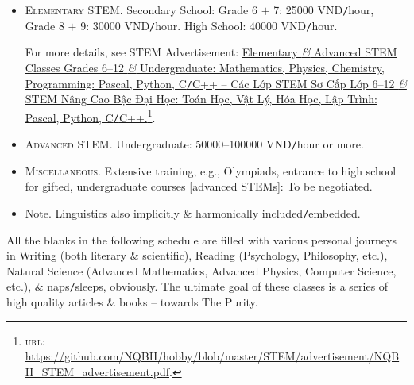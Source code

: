 \documentclass[landscape,a4paper]{article}
\begin{document}
\begin{itemize}
	\item \textsc{Elementary STEM.} Secondary School: Grade 6 $+$ 7: 25000 VND{\tt/}hour, Grade 8 $+$ 9: 30000 VND{\tt/}hour. High School: 40000 VND{\tt/}hour.
	
	For more details, see STEM Advertisement: \href{https://github.com/NQBH/hobby/blob/master/STEM/advertisement/NQBH_STEM_advertisement.pdf}{Elementary {\it\&} Advanced STEM Classes Grades 6--12 {\it\&} Undergraduate: Mathematics, Physics, Chemistry, Programming: Pascal, Python, C{\tt/}C++ -- Các Lớp STEM Sơ Cấp Lớp 6--12 {\it\&} STEM Nâng Cao Bậc Đại Học: Toán Học, Vật Lý, Hóa Học, Lập Trình: Pascal, Python, C{\tt/}C++.}\footnote{\textsc{url}: \url{https://github.com/NQBH/hobby/blob/master/STEM/advertisement/NQBH_STEM_advertisement.pdf}.}.
	\item \textsc{Advanced STEM.} Undergraduate: 50000--100000 VND{\tt/}hour or more.
	\item \textsc{Miscellaneous.} Extensive training, e.g., Olympiads, entrance to high school for gifted, undergraduate courses [advanced STEMs]: To be negotiated.
	\item {\sf Note.} Linguistics also implicitly \& harmonically included{\tt/}embedded.
	
\end{itemize}
All the blanks in the following schedule are filled with various personal journeys in Writing (both literary \& scientific), Reading (Psychology, Philosophy, etc.), Natural Science (Advanced Mathematics, Advanced Physics, Computer Science, etc.), \& naps{\tt/}sleeps, obviously. The ultimate goal of these classes is a series of high quality articles \& books -- towards The Purity.
\cleardoublepage
\CellHeight{.4in}
\CellWidth{1.4in}
\TextSize{\normalsize}
\SevenDay
\TwentyFourHour
{}
\begin{schedule}
\end{schedule}
\end{document}
